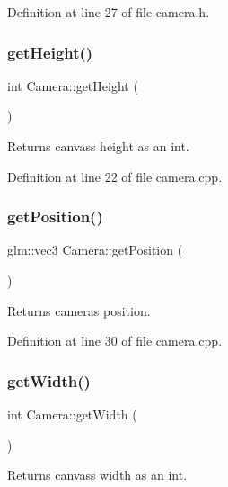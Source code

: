 Definition at line 27 of file camera.\+h.

\mbox{\label{class_camera_a315be9ee1238abddce9a580430ad403a}} 
\subsubsection{\texorpdfstring{get\+Height()}{getHeight()}}
{\footnotesize\ttfamily int Camera\+::get\+Height (\begin{DoxyParamCaption}{ }\end{DoxyParamCaption})}



Returns canvas\textquotesingle{}s height as an int. 



Definition at line 22 of file camera.\+cpp.

\mbox{\label{class_camera_a520c5a7413b3e704f2f442288db17bcf}} 
\subsubsection{\texorpdfstring{get\+Position()}{getPosition()}}
{\footnotesize\ttfamily glm\+::vec3 Camera\+::get\+Position (\begin{DoxyParamCaption}{ }\end{DoxyParamCaption})}

Returns camera\textquotesingle{}s position. 

Definition at line 30 of file camera.\+cpp.

\mbox{\label{class_camera_a1122b43b7db5e69e9d6e187b74a6ec7e}} 
\subsubsection{\texorpdfstring{get\+Width()}{getWidth()}}
{\footnotesize\ttfamily int Camera\+::get\+Width (\begin{DoxyParamCaption}{ }\end{DoxyParamCaption})}



Returns canvas\textquotesingle{}s width as an int. 



